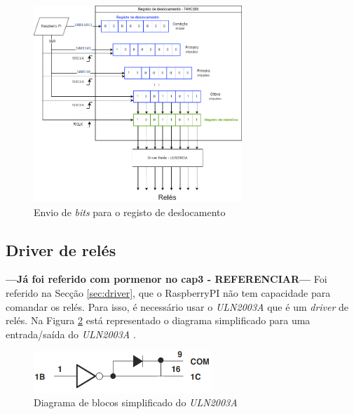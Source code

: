 
\begin{figure}[hbtp]
	\centering
	\includegraphics[width=0.7\textwidth]{figures/registo deslocamente.drawio.png}
	\caption{Envio de \textit{bits} para o registo de deslocamento}
	\label{fig:esquematico74hc595}
\end{figure}

\subsection{Driver de relés}
\label{sec:driverreles}

\textbf{---Já foi referido com pormenor no cap3 - REFERENCIAR---}
Foi referido na Secção \ref{sec:driver}, que o \gls{RaspberryPI} não tem capacidade para comandar os relés. Para isso, é necessário usar o \textit{ULN2003A} que é um \textit{driver} de relés. Na Figura \ref{fig:diagramablocos2003} está representado o diagrama simplificado para uma entrada/saída do \textit{ULN2003A} \cite{ULN2003}.

\begin{figure}[hbtp]
	\centering
	\includegraphics[width=0.6\textwidth]{figures/uln2003_diagramablocos.png}
	\caption{Diagrama de blocos simplificado do \textit{ULN2003A}}
	\label{fig:diagramablocos2003}
\end{figure}

